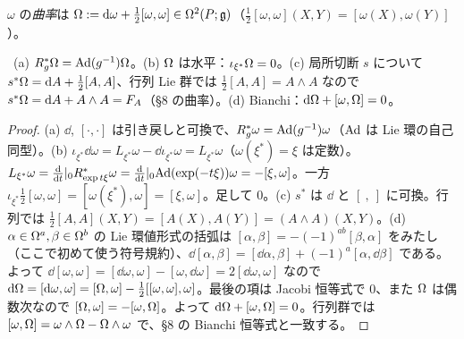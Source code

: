 \begin{defn}[曲率]\label{C:def:Pcurv}
$\omega$ の\emph{曲率}は $\Omega:=\mathrm{d}\omega+\tfrac12[\omega,\omega]\in\Omega^2(P;\mathfrak g)$（$\tfrac12[\omega,\omega](X,Y)=[\omega(X),\omega(Y)]$）。
\end{defn}
\begin{prop}\label{C:prop:Pcurv}\tP\
(a) $R_g^*\Omega=\mathrm{Ad}(g^{-1})\Omega$。(b) $\Omega$ は水平：$\iota_{\xi^*}\Omega=0$。(c) 局所切断 $s$ について $s^*\Omega=\mathrm{d} A+\tfrac12[A,A]$、行列 Lie 群では $\tfrac12[A,A]=A\wedge A$ なので $s^*\Omega=\mathrm{d} A+A\wedge A=F_A$（§8 の曲率）。(d) Bianchi：$\mathrm{d}\Omega+[\omega,\Omega]=0$。
\end{prop}
\begin{proof}
(a) $\dd$, $[\cdot,\cdot]$ は引き戻しと可換で、$R_g^*\omega=\mathrm{Ad}(g^{-1})\omega$（$\mathrm{Ad}$ は Lie 環の自己同型）。(b) $\iota_{\xi^*}\dd\omega=L_{\xi^*}\omega-\dd\iota_{\xi^*}\omega=L_{\xi^*}\omega$（$\omega(\xi^*)=\xi$ は定数）。$L_{\xi^*}\omega=\frac{\mathrm{d}}{\mathrm{d} t}|_0R^*_{\exp t\xi}\omega=\frac{\mathrm{d}}{\mathrm{d} t}|_0\mathrm{Ad}(\exp(-t\xi))\omega=-[\xi,\omega]$。一方 $\iota_{\xi^*}\frac12[\omega,\omega]=[\omega(\xi^*),\omega]=[\xi,\omega]$。足して $0$。(c) $s^*$ は $\dd$ と $[\ ,\ ]$ に可換。行列では $\frac12[A,A](X,Y)=[A(X),A(Y)]=(A\wedge A)(X,Y)$。(d) $\alpha\in\Omega^a,\beta\in\Omega^b$ の Lie 環値形式の括弧は $[\alpha,\beta]=-(-1)^{ab}[\beta,\alpha]$ をみたし（ここで初めて使う符号規約）、$\dd[\alpha,\beta]=[\dd\alpha,\beta]+(-1)^a[\alpha,\dd\beta]$ である。よって $\dd[\omega,\omega]=[\dd\omega,\omega]-[\omega,\dd\omega]=2[\dd\omega,\omega]$ なので $\mathrm{d}\Omega=[\mathrm{d}\omega,\omega]=[\Omega,\omega]-\frac12[[\omega,\omega],\omega]$。最後の項は Jacobi 恒等式で $0$、また $\Omega$ は偶数次なので $[\Omega,\omega]=-[\omega,\Omega]$。よって $\mathrm{d}\Omega+[\omega,\Omega]=0$。行列群では $[\omega,\Omega]=\omega\wedge\Omega-\Omega\wedge\omega$ で、§8 の Bianchi 恒等式と一致する。
\end{proof}

